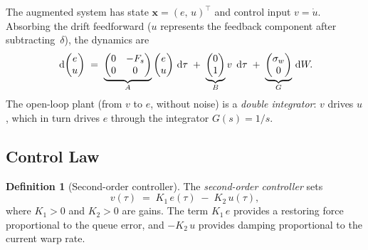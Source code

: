 \documentclass[11pt, a4paper]{article}
\theoremstyle{definition}
\newtheorem{definition}{Definition}[section]
\theoremstyle{plain}
\theoremstyle{remark}
\newcommand{\dd}{\,\mathrm{d}}                   %
\begin{document}
The augmented system has state $\mathbf{x} = (e,\,u)^{\!\top}$
and control input $v = \dot{u}$.  Absorbing the drift feedforward
($u$ represents the feedback component after subtracting~$\delta$),
the dynamics are
\begin{equation}\label{eq:augmented-dynamics}
  \dd\!\begin{pmatrix} e \\ u \end{pmatrix}
  \;=\;
  \underbrace{%
    \begin{pmatrix} 0 & -F_s \\ 0 & 0 \end{pmatrix}
  }_{A}
  \begin{pmatrix} e \\ u \end{pmatrix}\dd\tau
  \;+\;
  \underbrace{%
    \begin{pmatrix} 0 \\ 1 \end{pmatrix}
  }_{B}
  v\;\dd\tau
  \;+\;
  \underbrace{%
    \begin{pmatrix} \sigma_w \\ 0 \end{pmatrix}
  }_{G}
  \dd W.
\end{equation}
The open-loop plant (from $v$ to $e$, without noise) is a
\emph{double integrator}: $v$ drives $u$, which in turn drives $e$
through the integrator $G(s) = 1/s$.

\subsection{Control Law}\label{sec:2nd-control-law}

\begin{definition}[Second-order controller]\label{def:2nd-controller}
  The \emph{second-order controller} sets
  \begin{equation}\label{eq:2nd-law}
    v(\tau) \;=\; K_1\,e(\tau) \;-\; K_2\,u(\tau),
  \end{equation}
  where $K_1 > 0$ and $K_2 > 0$ are gains.  The term $K_1\,e$
  provides a restoring force proportional to the queue error,
  and $-K_2\,u$ provides damping proportional to the current
  warp rate.
\end{definition}
\end{document}
